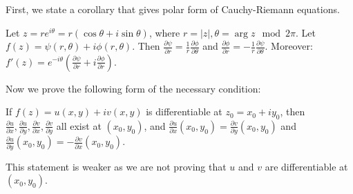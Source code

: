 First, we state a corollary that gives polar form of Cauchy-Riemann equations.

\begin{corollary}\label{corollary:6.3}
Let $z = re^{i\theta} = r(\cos \theta + i\sin \theta)$, where $r = |z|, \theta = \arg z \mod 2\pi$. Let $f(z) = \psi(r, \theta) + i\phi(r, \theta)$. Then $\frac{\partial \psi}{\partial r} = \frac{1}{r}\frac{\partial \phi}{\partial \theta}$ and $\frac{\partial \phi}{\partial r} = -\frac{1}{r}\frac{\partial \psi}{\partial \theta}$.
Moreover: $f'(z) = e^{-i\theta}(\frac{\partial \psi}{\partial r} + i\frac{\partial \phi}{\partial r})$.
    \end{corollary}
Now we prove the following form of the necessary condition:
\begin{proposition}\label{proposition:6.6}
     If $f(z) = u(x,y) + iv(x,y)$ is differentiable at $z_0 = x_0 + iy_0$, then $\frac{\partial u}{\partial x}, \frac{\partial u}{\partial y}, \frac{\partial v}{\partial x}, \frac{\partial v}{\partial y}$ all exist at $(x_0, y_0)$, and $\frac{\partial u}{\partial x}(x_0, y_0) = \frac{\partial v}{\partial y}(x_0, y_0)$ and $\frac{\partial u}{\partial y}(x_0, y_0) = -\frac{\partial v}{\partial x}(x_0, y_0)$.
\end{proposition}    
This statement is weaker as we are not proving that $u$ and $v$ are differentiable at $(x_0, y_0)$.
    
